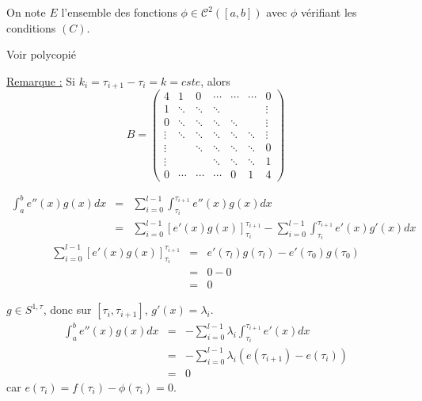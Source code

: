 On note $E$ l'ensemble des fonctions $\phi\in\mathcal{C}^2([a,b])$ avec $\phi$ vérifiant les conditions $(C)$.

\begin{dem}
Voir polycopié
\end{dem}

\underline{Remarque :} Si $k_i=\tau_{i+1}-\tau_i=k=cste$, alors \[B=\begin{pmatrix} 4 & 1 & 0 & \cdots & \cdots & \cdots & 0 \\ 1 & \ddots & \ddots & \ddots & & & \vdots \\ 0 & \ddots & \ddots & \ddots & \ddots & & \vdots \\ \vdots & \ddots & \ddots & \ddots & \ddots & \ddots & \vdots \\ \vdots &  & \ddots & \ddots & \ddots & \ddots & 0 \\ \vdots & & & \ddots & \ddots & \ddots & 1 \\ 0 & \cdots & \cdots & \cdots & 0 & 1 & 4 \end{pmatrix}\]


\begin{dem}
\begin{eqnarray*}
\int_a^b e''(x)g(x) dx &=&\sum_{i=0}^{l-1} \int_{\tau_i}^{\tau_{i+1}} e''(x)g(x) dx \\
			&=& \sum_{i=0}^{l-1} [e'(x)g(x)]_{\tau_i}^{\tau_{i+1}} - \sum_{i=0}^{l-1} \int_{\tau_i}^{\tau_{i+1}} e'(x)g'(x) dx 
\end{eqnarray*}
\begin{eqnarray*}
\sum_{i=0}^{l-1} [e'(x)g(x)]_{\tau_i}^{\tau_{i+1}}&=&e'(\tau_l)g(\tau_l) - e'(\tau_0)g(\tau_0) \\
						&=& 0-0 \\
						&=& 0
\end{eqnarray*}

$g\in S^{1,\tau}$, donc sur $[\tau_i,\tau_{i+1}]$, $g'(x)=\lambda_i$.
\begin{eqnarray*}
\int_a^b e''(x)g(x) dx &=& -\sum_{i=0}^{l-1} \lambda_i \int_{\tau_i}^{\tau_{i+1}} e'(x) dx \\
			&=& -\sum_{i=0}^{l-1} \lambda_i (e(\tau_{i+1})-e(\tau_i)) \\
			&=& 0
\end{eqnarray*}
car $e(\tau_i)=f(\tau_i)-\phi(\tau_i)=0$. 
\end{dem}

